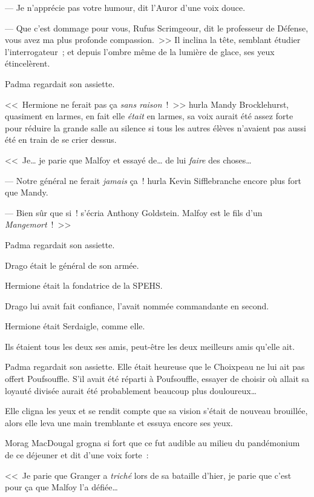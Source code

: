 --- Je n'apprécie pas votre humour, dit l'Auror d'une voix douce.

--- Que c'est dommage pour vous, Rufus Scrimgeour, dit le professeur de Défense, vous avez ma plus profonde compassion.~>> Il inclina la tête, semblant étudier l'interrogateur~; et depuis l'ombre même de la lumière de glace, ses yeux étincelèrent.

\later

Padma regardait son assiette.

<<~Hermione ne ferait pas ça \emph{sans raison}~!~>> hurla Mandy Brocklehurst, quasiment en larmes, en fait elle \emph{était} en larmes, sa voix aurait été assez forte pour réduire la grande salle au silence si tous les autres élèves n'avaient pas aussi été en train de se crier dessus.

<<~Je… je parie que Malfoy et essayé de… de lui \emph{faire} des choses…

--- Notre général ne ferait \emph{jamais} ça~! hurla Kevin Sifflebranche encore plus fort que Mandy.

--- Bien sûr que si~! s'écria Anthony Goldstein. Malfoy est le fils d'un \emph{Mangemort}~!~>>

\later

Padma regardait son assiette.

Drago était le général de son armée.

Hermione était la fondatrice de la SPEHS.

Drago lui avait fait confiance, l'avait nommée commandante en second.

Hermione était Serdaigle, comme elle.

Ils étaient tous les deux ses amis, peut-être les deux meilleurs amis qu'elle ait.

Padma regardait son assiette. Elle était heureuse que le Choixpeau ne lui ait pas offert Poufsouffle. S'il avait été réparti à Poufsouffle, essayer de choisir où allait sa loyauté divisée aurait été probablement beaucoup plus douloureux…

Elle cligna les yeux et se rendit compte que sa vision s'était de nouveau brouillée, alors elle leva une main tremblante et essuya encore ses yeux.

Morag MacDougal grogna si fort que ce fut audible au milieu du pandémonium de ce déjeuner et dit d'une voix forte~:

<<~Je parie que Granger a \emph{triché} lors de sa bataille d'hier, je parie que c'est pour ça que Malfoy l'a défiée…

